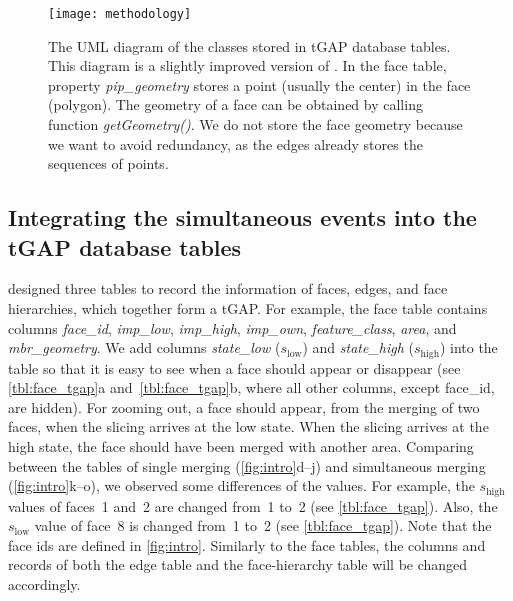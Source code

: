 \documentclass[twocolumn]{svjour3}          %
\begin{document}
\begin{figure*}[tb]
\centering
\texttt{[image: methodology]}
\caption{The UML diagram of the classes stored in tGAP database tables.
This diagram is a slightly improved version of \citet[]{Meijers2011Thesis}.
In the face table, property \emph{pip\_geometry} 
stores a point (usually the center) in the face (polygon).
The geometry of a face can be obtained by calling function \emph{getGeometry()}.
We do not store the face geometry because we want to avoid redundancy,
as the edges already stores the sequences of points.
}
\label{fig:uml_tgap}
\end{figure*}


\subsection{Integrating the simultaneous events into the tGAP database tables}
\label{sec:integrate_tgap}

\citet[]{Meijers2011Thesis} designed three tables 
to record the information of
faces, edges, and face hierarchies, 
which together form a tGAP.
For example, the face table contains columns \emph{face\_id}, 
\emph{imp\_low}, \emph{imp\_high}, \emph{imp\_own},
\emph{feature\_class}, \emph{area}, and \emph{mbr\_geometry}.
We add columns \emph{state\_low} ($s_\mathrm{low}$) 
and \emph{state\_high} ($s_\mathrm{high}$) into the table 
so that it is easy to see when a face should appear or disappear 
(see \tabls\ref{tbl:face_tgap}a and~\ref{tbl:face_tgap}b,
where all other columns, except face\_id, are hidden).
For zooming out, a face should appear, 
from the merging of two faces,
when the slicing arrives at the low state.
When the slicing arrives at the high state,
the face should have been merged with another area.
Comparing between the tables of single merging 
(\figs\ref{fig:intro}d--j)
and simultaneous merging (\figs\ref{fig:intro}k--o),
we observed some differences of the values.
For example, the $s_\mathrm{high}$ values of faces~1 and~2 are changed from~1 to~2
(see \tabl\ref{tbl:face_tgap}).
Also, the $s_\mathrm{low}$ value of face~8 is changed from~1 to~2
(see \tabl\ref{tbl:face_tgap}).
Note that the face ids are defined in \fig\ref{fig:intro}.
Similarly to the face tables, 
the columns and records of both the edge table and the face-hierarchy table 
will be changed accordingly.
\end{document}
